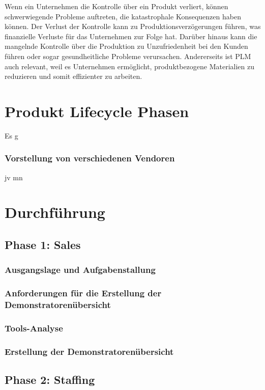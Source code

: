 \documentclass[a4paper, 12pt]{scrartcl}
\begin{document}
Wenn ein Unternehmen die Kontrolle über ein Produkt verliert, können schwerwiegende Probleme auftreten, die katastrophale Konsequenzen haben können. Der Verlust der Kontrolle kann zu Produktionsverzögerungen führen, was finanzielle Verluste für das Unternehmen zur Folge hat. Darüber hinaus kann die mangelnde Kontrolle über die Produktion zu Unzufriedenheit bei den Kunden führen oder sogar gesundheitliche Probleme verursachen. Andererseits ist PLM auch relevant, weil es Unternehmen ermöglicht, produktbezogene Materialien zu reduzieren und somit effizienter zu arbeiten.
	\section*{\normalsize Produkt Lifecycle Phasen}
Es g

	\subsubsection{Vorstellung von verschiedenen Vendoren}
jv mn 
	\newpage
	\section{Durchführung}
	\subsection{Phase 1: Sales} 
	\subsubsection{Ausgangslage und Aufgabenstallung} %
	\subsubsection{Anforderungen für die Erstellung der Demonstratorenübersicht} %
	\subsubsection{Tools-Analyse}%
	\subsubsection{Erstellung der Demonstratorenübersicht}
	\newpage
	\subsection{Phase 2: Staffing}
\end{document}
